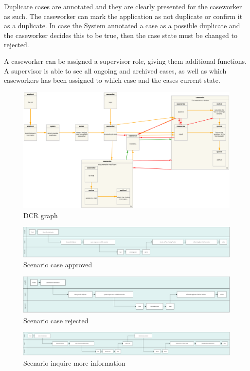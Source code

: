 \vspace{2mm}

Duplicate cases are annotated and they are clearly presented for the caseworker as such. The caseworker can mark the application as not duplicate or confirm it as a duplicate.     In case the System annotated a case as a possible duplicate and the caseworker decides this to be true, then the case state must be changed to rejected.

\vspace{2mm}

A caseworker can be assigned a supervisor role, giving them additional functions. A supervisor is able to see all ongoing and archived cases, as well as which caseworkers has been assigned to which case and the cases current state.
\newpage
\begin{figure}[htb!]
	\includegraphics[width=\textwidth]{dcrgraph/dcrgraph.png}
	\caption{DCR graph}
\end{figure}

\newpage
\begin{figure}[htb!]
    \centering
    \includegraphics[width=\textwidth]{dcrgraph/case-approved.png}
    \caption{Scenario case approved}
\end{figure}

\begin{figure}[htb!]
    \centering
    \includegraphics[width=\textwidth]{dcrgraph/case-rejected.png}
    \caption{Scenario case rejected}
\end{figure}

\begin{figure}[htb!]
    \centering
    \includegraphics[width=\textwidth]{dcrgraph/case-inquire-information.png}
    \caption{Scenario inquire more information}
\end{figure}
